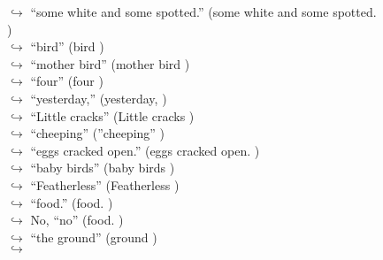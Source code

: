 \documentclass[11pt,a4paper, onecolumn]{article}
\begin{document}
\begin{figure}[t] \small \begin{tcolorbox}[boxsep=0pt,left=5pt,right=0pt,top=2pt,colback = yellow!5] \begin{dialogue}
 \small 
\colorbox{pink!25}{$\hookrightarrow$}
{ ``some white and some spotted.'' (some white and some spotted. ) }
\\
\colorbox{pink!25}{$\hookrightarrow$}
{ ``bird'' (bird ) }
\\
\colorbox{pink!25}{$\hookrightarrow$}
{ ``mother bird'' (mother bird ) }
\\
\colorbox{pink!25}{$\hookrightarrow$}
{ ``four'' (four ) }
\\
\colorbox{pink!25}{$\hookrightarrow$}
{ ``yesterday,'' (yesterday, ) }
\\
\colorbox{pink!25}{$\hookrightarrow$}
{ ``Little cracks'' (Little cracks ) }
\\
\colorbox{pink!25}{$\hookrightarrow$}
{ ``cheeping'' (''cheeping'' ) }
\\
\colorbox{pink!25}{$\hookrightarrow$}
{ ``eggs cracked open.'' (eggs cracked open. ) }
\\
\colorbox{pink!25}{$\hookrightarrow$}
{ ``baby birds'' (baby birds ) }
\\
\colorbox{pink!25}{$\hookrightarrow$}
{ ``Featherless'' (Featherless ) }
\\
\colorbox{pink!25}{$\hookrightarrow$}
{ ``food.'' (food. ) }
\\
\colorbox{pink!25}{$\hookrightarrow$}
\colorbox{red!25}{No,}
{ ``no'' (food. ) }
\\
\colorbox{pink!25}{$\hookrightarrow$}
{ ``the ground'' (ground ) }
\\
\colorbox{pink!25}{$\hookrightarrow$}

\end{dialogue}
\end{tcolorbox}
\end{figure}
\end{document}
